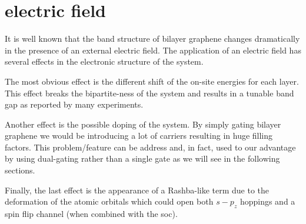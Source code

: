 \section{electric field}
It is well known that the band structure of bilayer graphene changes dramatically in the presence of an external electric field\cite{McCann2006, Castro2007, Oostinga2007, Zhang2009, Taychatanapat2010, Castro2010a, Ponomarenko2011, Allen2012, Sui2015}.
The application of an electric field has several effects in the electronic structure of the system.

The most obvious effect is the different shift of the on-site energies for each layer. This effect breaks the bipartite-ness of the system and results in a tunable band gap as reported by many experiments.

Another effect is the possible doping of the system. By simply gating bilayer graphene we would be introducing a lot of carriers resulting in huge filling factors. This problem/feature can be address and, in fact, used to our advantage by using dual-gating rather than a single gate as we will see in the following sections.

Finally, the last effect is the appearance of a Rashba-like term due to the deformation of the atomic orbitals which could open both $s-p_z$ hoppings and a spin flip channel (when combined with the \ac{soc}).



